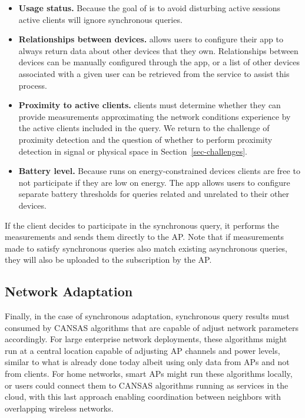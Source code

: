 \begin{itemize}

\item \textbf{Usage status.} Because the goal of \PS{} is to avoid disturbing
active sessions active clients will ignore synchronous queries.

\item \textbf{Relationships between devices.} \PS{} allows users to
configure their app to always return data about other devices that they own.
Relationships between devices can be manually configured through the app,
or a list of other devices associated with a given user can be retrieved from
the \PS{} service to assist this process.

\item \textbf{Proximity to active clients.} \PS{} clients must determine
whether they can provide measurements approximating the network conditions
experience by the active clients included in the query. We return to the
challenge of proximity detection and the question of whether to perform
proximity detection in signal or physical space in
Section~\ref{sec-challenges}.

\item \textbf{Battery level.} Because \PS{} runs on energy-constrained
  devices clients are free to not participate if they are low on energy. The
  \PS{} app allows users to configure separate battery thresholds for queries
  related and unrelated to their other devices.

\end{itemize}

If the client decides to participate in the synchronous query, it performs
the measurements and sends them directly to the AP. Note that if measurements
made to satisfy synchronous queries also match existing asynchronous queries,
they will also be uploaded to the \PS{} subscription by the AP.

\subsection{Network Adaptation}

Finally, in the case of synchronous adaptation, synchronous query results must
consumed by CANSAS algorithms that are capable of adjust network parameters
accordingly. For large enterprise network deployments, these algorithms might
run at a central location capable of adjusting AP channels and power levels,
similar to what is already done today albeit using only data from APs and not
from clients. For home networks, smart \PS{} APs might run these algorithms
locally, or users could connect them to CANSAS algorithms running as services
in the cloud, with this last approach enabling coordination between neighbors
with overlapping wireless networks.
